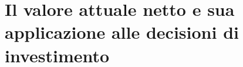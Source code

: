 \chapter{Il valore attuale netto e sua applicazione alle decisioni di investimento}
\label{chap:Il_VAN}

